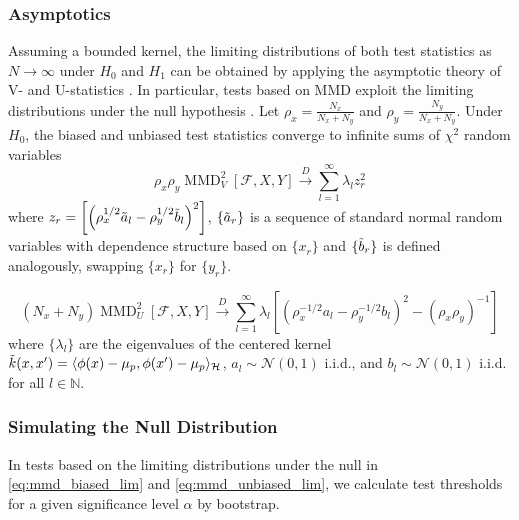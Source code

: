 \documentclass[a4paper,11pt]{article}
\begin{document}
\subsubsection{Asymptotics}
Assuming a bounded kernel, the limiting distributions of both test statistics as $N \rightarrow \infty$ under $H_{0}$ and $H_{1}$ can be obtained by applying the asymptotic theory of V- and U-statistics \cite{serfling_approximation_2002}. In particular, tests based on MMD exploit the limiting distributions under the null hypothesis \cite{gretton_kernel_2012, chwialkowski_wild_2016}. Let $\rho_{x} =\frac{N_{x}}{N_{x} + N_{y}}$ and $\rho_{y} = \frac{N_{y}}{N_{x} + N_{y}}$. Under $H_{0}$, the biased and unbiased test statistics converge to infinite sums of $\chi^{2}$ random variables
\begin{equation}
    \rho_{x}\rho_{y} \operatorname{MMD}_{V}^{2}[\mathcal{F}, X, Y] \overset{D}{\rightarrow} \sum_{l=1}^{\infty} \lambda_{l}z_{r}^{2}
    \label{eq:mmd_biased_lim}
\end{equation}
where $z_{r} = \left[\left(\rho_{x}^{1 / 2} \Tilde{a}_{l}-\rho_{y}^{1 / 2} \Tilde{b}_{l}\right)^{2}\right]$, $\{\Tilde{a}_{r}\}$ is a sequence of standard normal random variables with dependence structure based on $\{x_{r}\}$ and $\{\Tilde{b}_{r}\}$ is defined analogously, swapping $\{x_{r}\}$ for $\{y_{r}\}$.

\begin{equation}
    (N_{x}+N_{y}) \operatorname{MMD}_{U}^{2}[\mathcal{F}, X, Y] \overset{D}{\rightarrow} \sum_{l=1}^{\infty} \lambda_{l}\left[\left(\rho_{x}^{-1 / 2} a_{l}-\rho_{y}^{-1 / 2} b_{l}\right)^{2}-\left(\rho_{x} \rho_{y}\right)^{-1}\right]
    \label{eq:mmd_unbiased_lim}
\end{equation}
where $\{\lambda_{l}\}$ are the eigenvalues of the centered kernel $\Tilde{k}(x, x') = \langle \phi(x) - \mathbf{\mu}_{p}, \phi(x') - \mathbf{\mu}_{p} \rangle_{\mathcal{H}}$, $a_{l} \sim \mathcal{N}(0, 1)$ i.i.d., and $b_{l} \sim \mathcal{N}(0, 1)$ i.i.d. for all $l \in \mathbb{N}$.

\subsubsection{Simulating the Null Distribution}
In tests based on the limiting distributions under the null in \eqref{eq:mmd_biased_lim} and \eqref{eq:mmd_unbiased_lim}, we calculate test thresholds for a given significance level $\alpha$ by bootstrap.
\end{document}
